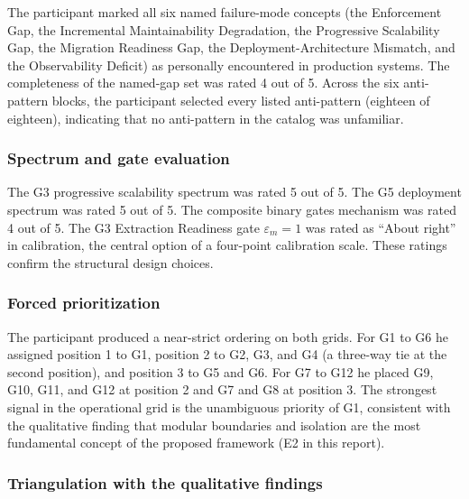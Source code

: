 The participant marked all six named failure-mode concepts (the Enforcement Gap, the Incremental Maintainability Degradation, the Progressive Scalability Gap, the Migration Readiness Gap, the Deployment-Architecture Mismatch, and the Observability Deficit) as personally encountered in production systems. The completeness of the named-gap set was rated 4 out of 5. Across the six anti-pattern blocks, the participant selected every listed anti-pattern (eighteen of eighteen), indicating that no anti-pattern in the catalog was unfamiliar.

\subsubsection*{Spectrum and gate evaluation}

The G3 progressive scalability spectrum was rated 5 out of 5. The G5 deployment spectrum was rated 5 out of 5. The composite binary gates mechanism was rated 4 out of 5. The G3 Extraction Readiness gate $\varepsilon_m = 1$ was rated as ``About right'' in calibration, the central option of a four-point calibration scale. These ratings confirm the structural design choices.

\subsubsection*{Forced prioritization}

The participant produced a near-strict ordering on both grids. For G1 to G6 he assigned position 1 to G1, position 2 to G2, G3, and G4 (a three-way tie at the second position), and position 3 to G5 and G6. For G7 to G12 he placed G9, G10, G11, and G12 at position 2 and G7 and G8 at position 3. The strongest signal in the operational grid is the unambiguous priority of G1, consistent with the qualitative finding that modular boundaries and isolation are the most fundamental concept of the proposed framework (E2 in this report).

\subsubsection*{Triangulation with the qualitative findings}

